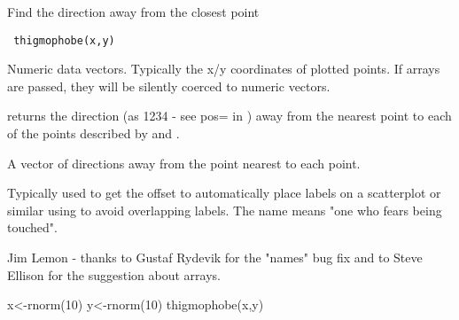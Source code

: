 \begin{Description}\relax
Find the direction away from the closest point
\end{Description}
\begin{Usage}
\begin{verbatim}
 thigmophobe(x,y)
\end{verbatim}
\end{Usage}
\begin{Arguments}
\begin{ldescription}
\item[\code{x,y}] Numeric data vectors. Typically the x/y coordinates of
plotted points. If arrays are passed, they will be silently coerced to
numeric vectors.
\end{ldescription}
\end{Arguments}
\begin{Details}\relax
{} returns the direction (as 1\textbar{}2\textbar{}3\textbar{}4 - see pos= in 
) away from the nearest point to each of the points 
described by  and .
\end{Details}
\begin{Value}
A vector of directions away from the point nearest to each point.
\end{Value}
\begin{Note}\relax
Typically used to get the offset to automatically place labels
on a scatterplot or similar using  to avoid 
overlapping labels. The name means "one who fears being touched".
\end{Note}
\begin{Author}\relax
Jim Lemon - thanks to Gustaf Rydevik for the "names" bug fix
and to Steve Ellison for the suggestion about arrays.
\end{Author}
\begin{SeeAlso}\relax
{}
\end{SeeAlso}
\begin{Examples}
\begin{ExampleCode}
 x<-rnorm(10)
 y<-rnorm(10)
 thigmophobe(x,y)
\end{ExampleCode}
\end{Examples}

